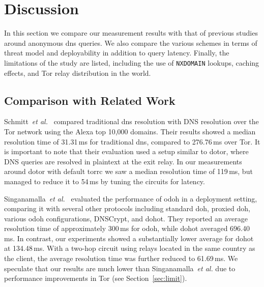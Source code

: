 \section{Discussion} \label{sec:disc}
In this section we compare our measurement results with that of previous
studies around anonymous \ac{dns} queries. We also compare the various schemes
in terms of threat model and deployability in addition to query latency.
Finally, the limitations of the study are listed, including the use of \texttt{NXDOMAIN}
lookups, caching effects, and Tor relay distribution in the world.

\subsection{Comparison with Related Work} \label{sec:compare}

Schmitt~\emph{et al.}~\cite{ODNS} compared traditional \ac{dns} resolution with
DNS resolution over the Tor network using the Alexa top 10,000 domains. Their
results showed a median resolution time of 31.31\,ms for traditional \ac{dns},
compared to 276.76\,ms over Tor. It is important to note that their evaluation
used a setup similar to \ac{dotor}, where DNS queries are resolved in plaintext
at the exit relay. In our measurements around \ac{dotor} with default torrc we
saw a median resolution time of 119\,ms, but managed to reduce it to 54\,ms by
tuning the circuits for latency.

Singanamalla~\emph{et al.}~\cite{singanamalla2020} evaluated the performance of
\ac{odoh} in a deployment setting, comparing it with several other protocols
including standard \ac{doh}, proxied \ac{doh}, various \ac{odoh}
configurations, DNSCrypt, and \ac{dohot}. They reported an average resolution
time of approximately 300\,ms for \ac{odoh}, while \ac{dohot} averaged
696.40\,ms. In contrast, our experiments showed a substantially lower average
for \ac{dohot} at 134.48\,ms. With a two-hop circuit using relays located in
the same country as the client, the average resolution time was further reduced
to 61.69\,ms. We speculate that our results are much lower than
Singanamalla~\emph{et al.} due to performance improvements in Tor (see
Section~\ref{sec:limit}).

